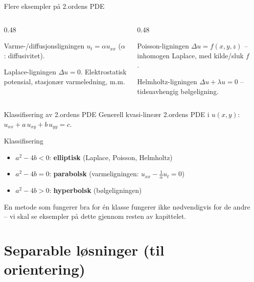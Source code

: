 \documentclass[11pt,aspectratio=169]{beamer}
\begin{document}
\begin{frame}{Flere eksempler på 2.ordens PDE}
\begin{columns}[t]
\begin{column}{0.48\textwidth}
\begin{eksb}{Varme-/diffusjonsligningen}
$u_t=\alpha u_{xx}$ ($\alpha$: diffusivitet).
\end{eksb}
\vspace{4pt}
\begin{eksb}{Laplace-ligningen}
$\Delta u=0$. Elektrostatisk potensial, stasjonær varmeledning, m.m.
\end{eksb}
\end{column}
\begin{column}{0.48\textwidth}
\begin{eksb}{Poisson-ligningen}
$\Delta u = f(x,y,z)$ -- inhomogen Laplace, med kilde/sluk $f$.
\end{eksb}
\vspace{4pt}
\begin{eksb}{Helmholtz-ligningen}
$\Delta u+\lambda u=0$ -- tidsuavhengig bølgeligning.
\end{eksb}
\end{column}
\end{columns}
\end{frame}

\begin{frame}{Klassifisering av 2.ordens PDE}
Generell kvasi-lineær 2.ordens PDE i $u(x,y)$: $u_{xx}+a\,u_{xy}+b\,u_{yy}=c$.
\begin{oppsumb}{Klassifisering}
\begin{itemize}
\item $a^2-4b<0$: \textbf{elliptisk} (Laplace, Poisson, Helmholtz)
\item $a^2-4b=0$: \textbf{parabolsk} (varmeligningen: $u_{xx}-\tfrac1\alpha u_t=0$)
\item $a^2-4b>0$: \textbf{hyperbolsk} (bølgeligningen)
\end{itemize}
\end{oppsumb}
En metode som fungerer bra for én klasse fungerer ikke nødvendigvis for de andre -- vi skal se eksempler på dette gjennom resten av kapittelet.
\end{frame}

\section{Separable løsninger (til orientering)}
\end{document}
